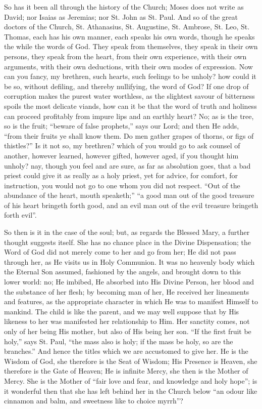 So has it been all through the history of the Church; Moses does
not write as David; nor Isaias as Jeremias; nor St. John as St. Paul.
And so of the great doctors of the Church, St. Athanasius, St.
Augustine, St. Ambrose, St. Leo, St. Thomas, each has his own manner,
each speaks his own words, though he speaks the while the words of
God. They speak from themselves, they speak in their own persons, they
speak from the heart, from their own experience, with their own
arguments, with their own deductions, with their own modes of
expression. Now can you fancy, my brethren, such hearts, such feelings
to be unholy? how could it be so, without defiling, and thereby
nullifying, the word of God? If one drop of corruption makes the
purest water worthless, as the slightest savour of bitterness spoils
the most delicate viands, how can it be that the word of truth and
holiness can proceed profitably from impure lips and an earthly heart?
No; as is the tree, so is the fruit; ``beware of false
prophets,'' says our Lord; and then He adds, ``from their
fruits ye shall know them. Do men gather grapes of thorns, or figs of
thistles?'' Is it not so, my brethren? which of you would go to
ask counsel of another, however learned, however gifted, however aged,
if you thought him unholy? nay, though you feel and are sure, as far
as absolution goes, that a bad priest could give it as really as a
holy priest, yet for advice, for comfort, for instruction, you would
not go to one whom you did not respect. ``Out of the abundance of
the heart, mouth speaketh;'' ``a good man out of the good
treasure of his heart bringeth forth good, and an evil man out of the
evil treasure bringeth forth evil''.

So then is it in the case of the soul; but, as regards the Blessed
Mary, a further thought suggests itself. She has no chance place in
the Divine Dispensation; the Word of God did not merely come to her
and go from her; He did not pass through her, as He visits us in Holy
Communion. It was no heavenly body which the Eternal Son assumed,
fashioned by the angels, and brought down to this lower world: no; He
imbibed, He absorbed into His Divine Person, her blood and the
substance of her flesh; by becoming man of her, He received her
lineaments and features, as the appropriate character in which He was
to manifest Himself to mankind. The child is like the parent, and we
may well suppose that by His likeness to her was manifested her
relationship to Him. Her sanctity comes, not only of her being His
mother, but also of His being her son. ``If the first fruit be
holy,'' says St. Paul, ``the mass also is holy; if the mass be
holy, so are the branches.'' And hence the titles which we are
accustomed to give her. He is the Wisdom of God, she therefore is the
Seat of Wisdom; His Presence is Heaven, she therefore is the Gate of
Heaven; He is infinite Mercy, she then is the Mother of Mercy. She is
the Mother of ``fair love and fear, and knowledge and holy
hope''; is it wonderful then that she has left behind her in the
Church below ``an odour like cinnamon and balm, and sweetness like
to choice myrrh''?

